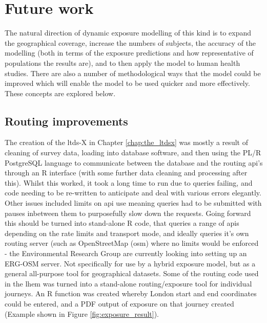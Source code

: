 \newpage
\section{Future work}
\label{sec:future_work}

The natural direction of dynamic exposure modelling of this kind is to expand the geographical coverage, increase the numbers of subjects, the accuracy of the modelling (both in terms of the exposure predictions and how representative of populations the results are), and to then apply the model to human health studies. There are also a number of methodological ways that the model could be improved which will enable the model to be used quicker and more effectively. These concepts are explored below.

\subsection{Routing improvements}
\label{subsec:routing_improvements}

The creation of the \gls{ltds}-X in Chapter \ref{chap:the_ltdsx} was mostly a result of cleaning of survey data, loading into database software, and then using the PL/R PostgreSQL language to communicate between the database and the routing \gls{api}'s through an R interface (with some further data cleaning and processing after this). Whilst this worked, it took a long time to run due to queries failing, and code needing to be re-written to anticipate and deal with various errors elegantly. Other issues included limits on \gls{api} use meaning queries had to be submitted with pauses inbetween them to purposefully slow down the requests. Going forward this should be turned into stand-alone R code, that queries a range of \gls{api}s depending on the rate limits and transport mode, and ideally queries it's own routing server (such as OpenStreetMap (\gls{osm}) where no limits would be enforced - the Environmental Research Group are currently looking into setting up an ERG-OSM server. Not specifically for use by a hybrid exposure model, but as a general all-purpose tool for geographical datasets. Some of the routing code used in the \gls{lhem} was turned into a stand-alone routing/exposure tool for individual journeys. An R function was created whereby London start and end coordinates could be entered, and a PDF output of exposure on that journey created (Example shown in Figure \ref{fig:exposure_result}).

